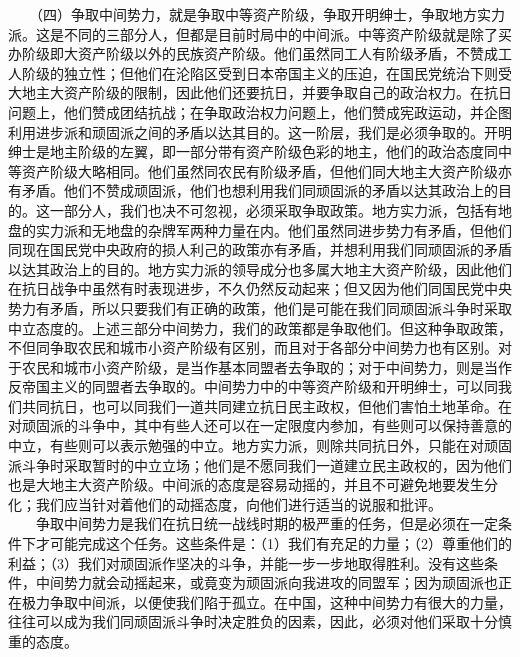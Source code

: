 \documentclass[cn,11pt,chinese]{elegantbook}
\begin{document}
　　（四）争取中间势力，就是争取中等资产阶级，争取开明绅士，争取地方实力派。这是不同的三部分人，但都是目前时局中的中间派。中等资产阶级就是除了买办阶级即大资产阶级以外的民族资产阶级。他们虽然同工人有阶级矛盾，不赞成工人阶级的独立性；但他们在沦陷区受到日本帝国主义的压迫，在国民党统治下则受大地主大资产阶级的限制，因此他们还要抗日，并要争取自己的政治权力。在抗日问题上，他们赞成团结抗战；在争取政治权力问题上，他们赞成宪政运动，并企图利用进步派和顽固派之间的矛盾以达其目的。这一阶层，我们是必须争取的。开明绅士是地主阶级的左翼，即一部分带有资产阶级色彩的地主，他们的政治态度同中等资产阶级大略相同。他们虽然同农民有阶级矛盾，但他们同大地主大资产阶级亦有矛盾。他们不赞成顽固派，他们也想利用我们同顽固派的矛盾以达其政治上的目的。这一部分人，我们也决不可忽视，必须采取争取政策。地方实力派，包括有地盘的实力派和无地盘的杂牌军两种力量在内。他们虽然同进步势力有矛盾，但他们同现在国民党中央政府的损人利己的政策亦有矛盾，并想利用我们同顽固派的矛盾以达其政治上的目的。地方实力派的领导成分也多属大地主大资产阶级，因此他们在抗日战争中虽然有时表现进步，不久仍然反动起来；但又因为他们同国民党中央势力有矛盾，所以只要我们有正确的政策，他们是可能在我们同顽固派斗争时采取中立态度的。上述三部分中间势力，我们的政策都是争取他们。但这种争取政策，不但同争取农民和城市小资产阶级有区别，而且对于各部分中间势力也有区别。对于农民和城市小资产阶级，是当作基本同盟者去争取的；对于中间势力，则是当作反帝国主义的同盟者去争取的。中间势力中的中等资产阶级和开明绅士，可以同我们共同抗日，也可以同我们一道共同建立抗日民主政权，但他们害怕土地革命。在对顽固派的斗争中，其中有些人还可以在一定限度内参加，有些则可以保持善意的中立，有些则可以表示勉强的中立。地方实力派，则除共同抗日外，只能在对顽固派斗争时采取暂时的中立立场；他们是不愿同我们一道建立民主政权的，因为他们也是大地主大资产阶级。中间派的态度是容易动摇的，并且不可避免地要发生分化；我们应当针对着他们的动摇态度，向他们进行适当的说服和批评。\\
　　争取中间势力是我们在抗日统一战线时期的极严重的任务，但是必须在一定条件下才可能完成这个任务。这些条件是：（1）我们有充足的力量；（2）尊重他们的利益；（3）我们对顽固派作坚决的斗争，并能一步一步地取得胜利。没有这些条件，中间势力就会动摇起来，或竟变为顽固派向我进攻的同盟军；因为顽固派也正在极力争取中间派，以便使我们陷于孤立。在中国，这种中间势力有很大的力量，往往可以成为我们同顽固派斗争时决定胜负的因素，因此，必须对他们采取十分慎重的态度。\\
\end{document}
